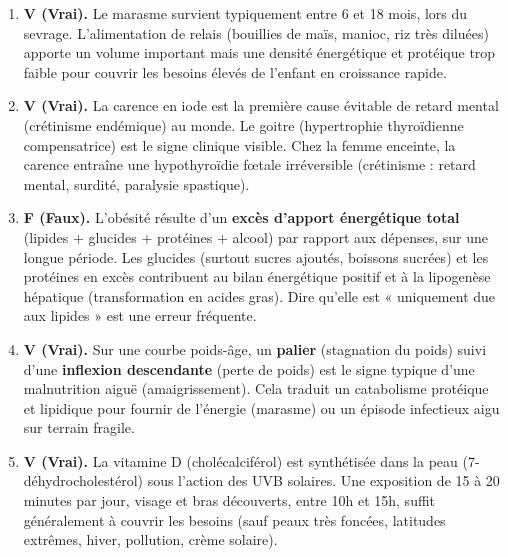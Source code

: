 \documentclass[11pt]{article}
\newcommand{\cle}[1]{{\popxbold\color{popdark}#1}}
\begin{document}
\begin{corrige}
\begin{enumerate}
    \item \textbf{V (Vrai).} Le \cle{marasme} survient typiquement entre 6 et 18 mois, lors du sevrage. L'alimentation de relais (bouillies de maïs, manioc, riz très diluées) apporte un volume important mais une densité énergétique et protéique trop faible pour couvrir les besoins élevés de l'enfant en croissance rapide.
    \item \textbf{V (Vrai).} La carence en \cle{iode} est la première cause évitable de retard mental (crétinisme endémique) au monde. Le \cle{goitre} (hypertrophie thyroïdienne compensatrice) est le signe clinique visible. Chez la femme enceinte, la carence entraîne une hypothyroïdie fœtale irréversible (crétinisme : retard mental, surdité, paralysie spastique).
    \item \textbf{F (Faux).} L'\cle{obésité} résulte d'un \textbf{excès d'apport énergétique total} (lipides + glucides + protéines + alcool) par rapport aux dépenses, sur une longue période. Les glucides (surtout sucres ajoutés, boissons sucrées) et les protéines en excès contribuent au bilan énergétique positif et à la lipogenèse hépatique (transformation en acides gras). Dire qu'elle est « uniquement due aux lipides » est une erreur fréquente.
    \item \textbf{V (Vrai).} Sur une courbe \cle{poids-âge}, un \textbf{palier} (stagnation du poids) suivi d'une \textbf{inflexion descendante} (perte de poids) est le signe typique d'une \cle{malnutrition aiguë} (amaigrissement). Cela traduit un catabolisme protéique et lipidique pour fournir de l'énergie (marasme) ou un épisode infectieux aigu sur terrain fragile.
    \item \textbf{V (Vrai).} La \cle{vitamine D} (cholécalciférol) est synthétisée dans la peau (7-déhydrocholestérol) sous l'action des \cle{UVB} solaires. Une exposition de 15 à 20 minutes par jour, visage et bras découverts, entre 10h et 15h, suffit généralement à couvrir les besoins (sauf peaux très foncées, latitudes extrêmes, hiver, pollution, crème solaire).
\end{enumerate}
\end{corrige}
\end{document}
